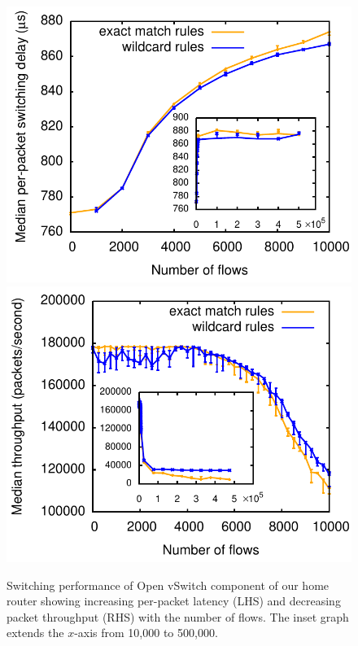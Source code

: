 \begin{figure} \centering
  \includegraphics[width=0.95\columnwidth]{switching-delay} \hspace{\columnsep}
  \includegraphics[width=0.95\columnwidth]{throughput}
  \caption{\label{f:performance}Switching performance of Open vSwitch component
    of our home router showing increasing per-packet latency (LHS) and
    decreasing packet throughput (RHS) with the number of flows.  The inset
    graph extends the $x$-axis from 10,000 to 500,000.} \vspace{-1em}
\end{figure}

